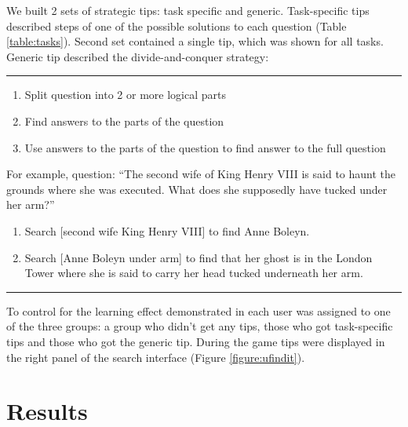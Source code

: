 \documentclass{sig-alternate}
\begin{document}
We built 2 sets of strategic tips: task specific and generic.
Task-specific tips described steps of one of the possible solutions to each question (Table \ref{table:tasks}).
Second set contained a single tip, which was shown for all tasks. Generic tip described the divide-and-conquer strategy:\\
\vspace{-2mm}
\hrule
\vspace{-2mm}
\begin{enumerate} \itemsep0pt \parskip0pt 
\item Split question into 2 or more logical parts
\item Find answers to the parts of the question
\item Use answers to the parts of the question to find answer to the full question
\end{enumerate}
\vspace{-2mm}
For example, question: ``The second wife of King Henry VIII is said to haunt the grounds where she was executed. What does she supposedly have tucked under her arm?''
\begin{enumerate} \itemsep0pt \parskip0pt 
\item Search [second wife King Henry VIII] to find Anne Boleyn.
\item Search [Anne Boleyn under arm] to find that her ghost is in the London Tower where she is said to carry her head tucked underneath her arm.
\end{enumerate}
\vspace{-1mm}
\hrule
\vspace{+2mm}
To control for the learning effect demonstrated in \cite{Moraveji:2011:MIU:2009916.2009966} each user was assigned to one of the three groups: a group who didn't get any tips, those who got task-specific tips and those who got the generic tip.
During the game tips were displayed in the right panel of the search interface (Figure \ref{figure:ufindit}).

\section{Results}

\vspace{-1mm}
\end{document}
